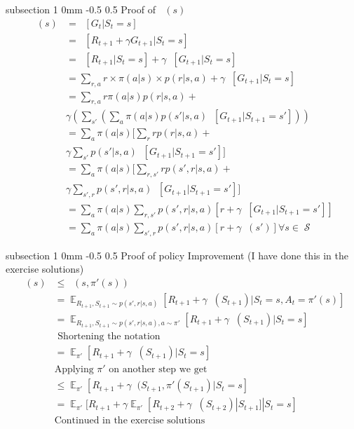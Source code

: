 \documentclass[twocolumn,11pt]{article}
\makeatletter
\DeclareMathOperator{\E}{\mathbb{E}}
\DeclareMathOperator{\state}{\mathcal{S}}
\DeclareMathOperator{\qp}{q_\pi} %
\DeclareMathOperator{\vp}{v_\pi} %
\DeclareMathOperator{\Ep}{\E_\pi}
\renewcommand{\subsection}{\@startsection
{subsection}%
{1}%
{0mm}%
{-0.5\baselineskip}%
{0.5\baselineskip}%
{\bfseries\color{blue}}} %
\makeatother
\begin{document}
\subsection{Proof of $\vp(s)$}
\begin{align*}
	\vp(s) &= \Ep[G_t | S_t = s] \\
	&= \Ep [R_{t+1} + \gamma G_{t+1} | S_t = s]\\
	&= \Ep[R_{t+1}  | S_t= s] + \gamma \Ep[G_{t+1} | S_t= s]\\
	&= \sum_{r,  a} r \times \pi(a|s) \times p(r|s,a) + \gamma  \Ep[G_{t+1} | S_t= s]\\
	&= \sum_{r,  a} r \pi(a|s)  p(r|s,a) +\\
	& \gamma  ( \sum_{s'}( \sum_a \pi(a|s)p(s'|s,a)  \Ep[G_{t+1} | S_{t+1} = s']))\\
	&= \sum_a \pi(a|s) [  \sum_r r p(r|s,a) + \\
	&\gamma \sum_{s'}p(s'|s,a) \Ep[G_{t+1} | S_{t+1} = s']  ]\\
	&= \sum_a \pi(a|s) [  \sum_{r,s'} r p(s',r|s,a) +\\
	& \gamma \sum_{s',r}p(s',r|s,a) \Ep[G_{t+1} | S_{t+1} = s']  ]\\
	&= \sum_a \pi(a|s) \sum_{r,s'} p(s',r|s,a)[ r + \gamma \Ep[G_{t+1} | S_{t+1} = s']  ]\\
	&= \sum_a \pi(a|s) \sum_{s',r} p(s',r|s,a) [r + \gamma \vp(s')] \forall s \in \state
\end{align*}

\subsection{Proof of policy Improvement (I have done this in the exercise solutions)}
\begin{align*}
	\vp(s) & \leq \qp(s,\pi'(s))\\
	&= \E_{R_{t+1},S_{t+1} \sim p(s',r|s,a) }[ R_{t+1}+ \gamma \vp(S_{t+1}) | S_t = s, A_t = \pi'(s)]\\
	&= \E_{R_{t+1},S_{t+1} \sim p(s',r|s,a) ,a \sim \pi'}[ R_{t+1}+ \gamma \vp(S_{t+1}) | S_t = s]\\
	& \text{ Shortening the notation}\\
	&= \E_{\pi'}[ R_{t+1}+ \gamma \vp(S_{t+1}) | S_t = s]\\
	& \text{Applying $\pi'$ on another step we get}\\
	& \leq  \E_{\pi'}[ R_{t+1} + \gamma \qp(S_{t+1}, \pi'(S_{t+1}) | S_t = s]\\
	& = \E_{\pi'}[ R_{t+1} + \gamma  \E_{\pi'}[R_{t+2} + \gamma \vp(S_{t+2}) | S_{t+1}]    | S_t = s]\\
	&\text{Continued in the exercise solutions}
\end{align*}
\end{document}
